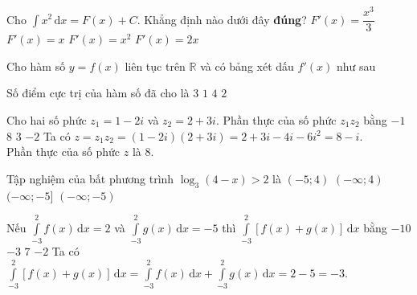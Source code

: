 \begin{ex}%
	Cho $\displaystyle\int x^2\mathrm{\,d}x=F(x)+C$. Khẳng định nào dưới đây \textbf{đúng}?
	\choice
	{$F'(x)=\dfrac{x^3}{3}$}
	{$F'(x)=x$}
	{\True $F'(x)=x^2$}
	{$F'(x)=2x$}
\end{ex}
\begin{ex}%
	Cho hàm số $y=f(x)$ liên tục trên $\mathbb{R}$ và có bảng xét dấu $f'(x)$ như sau
	\begin{center}
	\end{center}
Số điểm cực trị của hàm số đã cho là
	\choice
	{\True $3$}
	{$1$}
	{$4$}
	{$2$}
\end{ex}
\begin{ex}%
	Cho hai số phức $z_1=1-2i$ và $z_2=2+3i$. Phần thực của số phức $z_1z_2$ bằng
	\choice
	{$-1$}
	{\True $8$}
	{$3$}
	{$-2$}
	\loigiai
	{
		Ta có $z=z_1z_2=(1-2i)(2+3i)=2+3i-4i-6i^2=8-i$.\\
		Phần thực của số phức $z$ là $8$.
	}
\end{ex}
\begin{ex}%
	Tập nghiệm của bất phương trình $\log_3(4-x)>2$ là
	\choice
	{$(-5;4)$}
	{$(-\infty;4)$}
	{$(-\infty;-5]$}
	{\True $(-\infty;-5)$}
\end{ex}
\begin{ex}%
Nếu $\displaystyle\int\limits_{-3}^2f(x)\mathrm{\,d}x=2$ và $\displaystyle\int\limits_{-3}^2g(x)\mathrm{\,d}x=-5$ thì $\displaystyle\int\limits_{-3}^2\left[f(x)+g(x)\right]\mathrm{\,d}x$ bằng
	\choice
	{$-10$}
	{\True $-3$}
	{$7$}
	{$-2$}
	\loigiai
	{
	Ta có $\displaystyle\int\limits_{-3}^2\left[f(x)+g(x)\right]\mathrm{\,d}x=\displaystyle\int\limits_{-3}^2f(x)\mathrm{\,d}x+\displaystyle\int\limits_{-3}^2g(x)\mathrm{\,d}x=2-5=-3$.
	}
\end{ex}
